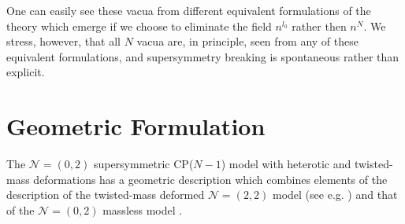 \documentclass[12pt]{article}
\newcommand{\ntwot}{${\mathcal N}= \left(2,2\right) $ }
\newcommand{\ntwoo}{${\mathcal N}= \left(0,2\right) $ }
\begin{document}
One can easily see these vacua from different equivalent formulations of the theory which emerge if  we choose to eliminate the
field $n^{l_0}$ rather then $n^N$. We stress, however, that
all $N$ vacua are, in principle, seen from any of these
equivalent formulations, and supersymmetry breaking is spontaneous
rather than explicit.

\section{Geometric Formulation}
\label{geomf}	
\setcounter{equation}{0}
	
	The \ntwoo supersymmetric CP($N-1$) model   with heterotic and twisted-mass deformations has  a geometric description which combines elements of
	the  description of the twisted-mass deformed
	\ntwot model (see e.g. \cite{SVZw}) and that of the \ntwoo massless model
	\cite{SYhet}.
	
\end{document}
